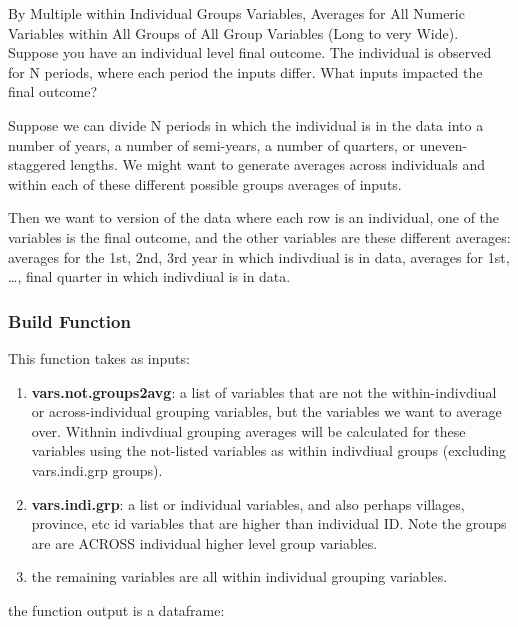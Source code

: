 \documentclass[
]{book}
\providecommand{\tightlist}{%
  \setlength{\itemsep}{0pt}\setlength{\parskip}{0pt}}
\begin{document}
By Multiple within Individual Groups Variables, Averages for All Numeric Variables within All Groups of All Group Variables (Long to very Wide). Suppose you have an individual level final outcome. The individual is observed for N periods, where each period the inputs differ. What inputs impacted the final outcome?

Suppose we can divide N periods in which the individual is in the data into a number of years, a number of semi-years, a number of quarters, or uneven-staggered lengths. We might want to generate averages across individuals and within each of these different possible groups averages of inputs.

Then we want to version of the data where each row is an individual, one of the variables is the final outcome, and the other variables are these different averages: averages for the 1st, 2nd, 3rd year in which indivdiual is in data, averages for 1st, \ldots, final quarter in which indivdiual is in data.

\hypertarget{build-function}{%
\subsubsection{Build Function}\label{build-function}}

This function takes as inputs:

\begin{enumerate}
\def\labelenumi{\arabic{enumi}.}
\tightlist
\item
  \textbf{vars.not.groups2avg}: a list of variables that are not the within-indivdiual or across-individual grouping variables, but the variables we want to average over. Withnin indivdiual grouping averages will be calculated for these variables using the not-listed variables as within indivdiual groups (excluding vars.indi.grp groups).
\item
  \textbf{vars.indi.grp}: a list or individual variables, and also perhaps villages, province, etc id variables that are higher than individual ID. Note the groups are are ACROSS individual higher level group variables.
\item
  the remaining variables are all within individual grouping variables.
\end{enumerate}

the function output is a dataframe:
\end{document}
